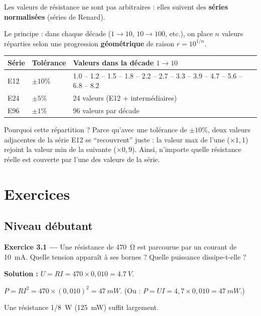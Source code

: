 \documentclass[12pt,a4paper,twoside]{book}
\begin{document}
Les valeurs de résistance ne sont pas arbitraires : elles suivent des \textbf{séries normalisées} (séries de Renard).

Le principe : dans chaque décade ($1 \rightarrow 10$, $10 \rightarrow 100$, etc.), on place $n$ valeurs réparties selon une progression \textbf{géométrique} de raison $r = 10^{1/n}$.

\begin{center}
\begin{tabular}{llp{7.5cm}}
\toprule
\textbf{Série} & \textbf{Tolérance} & \textbf{Valeurs dans la décade $1\rightarrow10$} \\
\midrule
E12 & $\pm 10\%$ & 1.0 -- 1.2 -- 1.5 -- 1.8 -- 2.2 -- 2.7 -- 3.3 -- 3.9 -- 4.7 -- 5.6 -- 6.8 -- 8.2 \\
E24 & $\pm 5\%$ & 24 valeurs (E12 + intermédiaires) \\
E96 & $\pm 1\%$ & 96 valeurs par décade \\
\bottomrule
\end{tabular}
\end{center}

\begin{intuition}
Pourquoi cette répartition ? Parce qu'avec une tolérance de $\pm10\%$, deux valeurs adjacentes de la série E12 se ``recouvrent'' juste : la valeur max de l'une ($\times 1{,}1$) rejoint la valeur min de la suivante ($\times 0{,}9$). Ainsi, n'importe quelle résistance réelle est couverte par l'une des valeurs de la série.
\end{intuition}

\section*{Exercices}

\subsection*{Niveau débutant}

\textbf{Exercice 3.1 —} Une résistance de \SI{470}{\ohm} est parcourue par un courant de \SI{10}{mA}. Quelle tension apparaît à ses bornes ? Quelle puissance dissipe-t-elle ?

\begin{pratique}
\textbf{Solution :} $U = RI = 470 \times 0{,}010 = \SI{4.7}{V}$.

$P = RI^2 = 470 \times (0{,}010)^2 = \SI{47}{mW}$. (Ou : $P = UI = 4{,}7 \times 0{,}010 = \SI{47}{mW}$.)

Une résistance 1/8~W (\SI{125}{mW}) suffit largement.
\end{pratique}
\end{document}
